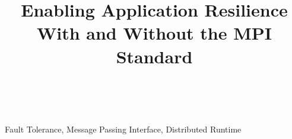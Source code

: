 \documentclass[10pt, conference, compsocconf]{IEEEtran}
\begin{document}
\title{Enabling Application Resilience With and Without the MPI Standard}
\author{
  \\
}

\maketitle



\begin{IEEEkeywords}
Fault Tolerance, Message Passing Interface, Distributed Runtime
\end{IEEEkeywords}


%






\newcommand{\BIBdecl}{\setlength{\itemsep}{0.03\baselineskip}} 


\end{document}
